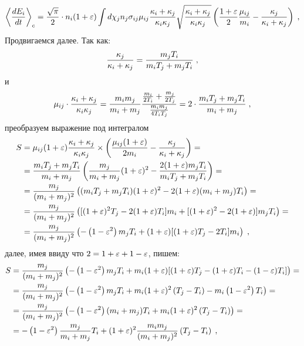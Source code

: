 \begin{equation}  
    \left\langle\frac{dE_i}{dt}\right\rangle_c = \frac{\sqrt{\pi}}{2}\cdot n_i(1+\varepsilon)\int d\chi_jn_j \sigma_{ij}\mu_{ij}
    \frac{\kappa_i+\kappa_j}{\kappa_i\kappa_j}\sqrt{\frac{\kappa_i+\kappa_j}{\kappa_i\kappa_j}}\left(\frac{1+\varepsilon}{2}\frac{\mu_{ij}}{m_i}
    -\frac{\kappa_j}{\kappa_i+\kappa_j}\right)\;,    
\end{equation}
Продвигаемся далее. Так как:
\begin{equation}
  \frac{\kappa_j}{\kappa_i+\kappa_j} = \frac{m_jT_i}{m_iT_j+m_jT_i}\;,
\end{equation}
и
\begin{equation}
  \mu_{ij}\cdot\frac{\kappa_i+\kappa_j}{\kappa_i\kappa_j} = \frac{m_im_j}{m_i+m_j}\frac{\frac{m_i}{2T_i}+\frac{m_j}{2T_j}}{\frac{m_im_j}{4T_iT_j}}=
  2\cdot\frac{m_iT_j+m_jT_i}{m_i+m_j}\;,
\end{equation}
преобразуем выражение под интегралом
\begin{equation*}
  \begin{split}
    S &= \mu_{ij}(1+\varepsilon)\frac{\kappa_i+\kappa_j}{\kappa_i\kappa_j}\times\left(\frac{\mu_{ij}(1+\varepsilon)}{2m_i}-\frac{\kappa_j}{\kappa_i+\kappa_j}\right) = \\
    &= \frac{m_iT_j+m_jT_i}{m_i+m_j}\left(\frac{m_j}{m_i+m_j}(1+\varepsilon)^2-\frac{2(1+\varepsilon)m_jT_i}{m_iT_j+m_jT_i}\right)=\\
    &= \frac{m_j}{(m_i+m_j)^2}\left((m_iT_j+m_jT_i)(1+\varepsilon)^2-2(1+\varepsilon)(m_i+m_j)T_i\right)=\\
    &= \frac{m_j}{(m_i+m_j)^2}\left([(1+\varepsilon)^2T_j-2(1+\varepsilon)T_i]m_i+[(1+\varepsilon)^2-2(1+\varepsilon)]m_jT_i\right)=\\
    &= \frac{m_j}{(m_i+m_j)^2}\left(-\left(1-\varepsilon^2\right)m_jT_i+(1+\varepsilon)[(1+\varepsilon)T_j-2T_i]m_i\right)\;,
  \end{split}
\end{equation*}
далее, имея ввиду что $2=1+\varepsilon+1-\varepsilon$, пишем:
\begin{equation*}
  \begin{split}
    S &= \frac{m_j}{(m_i+m_j)^2}\left(-\left(1-\varepsilon^2\right)m_jT_i+m_i(1+\varepsilon)[(1+\varepsilon)T_j-(1+\varepsilon)T_i-(1-\varepsilon)T_i]\right)=\\
    &= \frac{m_j}{(m_i+m_j)^2}\left(-\left(1-\varepsilon^2\right)m_jT_i+m_i(1+\varepsilon)^2\left(T_j-T_i\right)-m_i\left(1-\varepsilon^2\right)T_i\right) =\\
    &= \frac{m_j}{(m_i+m_j)^2}\left(-\left(1-\varepsilon^2\right)(m_i+m_j)T_i+m_i(1+\varepsilon)^2\left(T_j-T_i\right)\right)=\\
    &= -\left(1-\varepsilon^2\right)\frac{m_j}{m_i+m_j}T_i+(1+\varepsilon)^2\frac{m_im_j}{(m_i+m_j)^2}\left(T_j-T_i\right)\;,
  \end{split}
\end{equation*}
